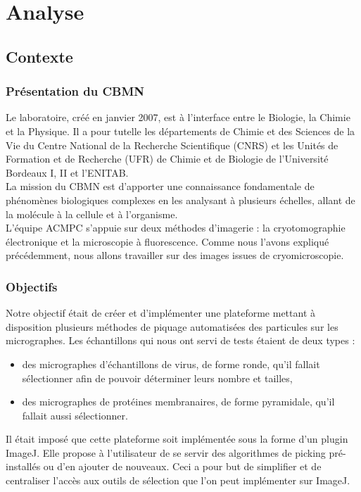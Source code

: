 \chapter{Analyse}

\section{Contexte}

\subsection{Présentation du CBMN}

Le laboratoire, créé en janvier 2007, est à l'interface entre le Biologie, la Chimie et la Physique. Il a pour tutelle les départements de Chimie et des Sciences de la Vie du Centre National de la Recherche Scientifique (CNRS) et les Unités de Formation et de Recherche (UFR) de Chimie et de Biologie de l'Université Bordeaux I, II et l'ENITAB. \\
La mission du CBMN est d'apporter une connaissance fondamentale de phénomènes biologiques complexes en les analysant à plusieurs échelles, allant de la molécule à la cellule et à l'organisme. \\
L'équipe ACMPC s'appuie sur deux méthodes d'imagerie : la cryotomographie  électronique et la microscopie à fluorescence. Comme nous l'avons expliqué précédemment, nous allons travailler sur des images issues de cryomicroscopie.  

\subsection{Objectifs}

\noindent
Notre objectif était de créer et d'implémenter une plateforme mettant à disposition plusieurs méthodes de piquage automatisées des particules sur les micrographes. Les échantillons qui nous ont servi de tests étaient de deux types :%
\begin{itemize}
\item des micrographes d'échantillons de virus, de forme ronde, qu'il fallait sélectionner afin de pouvoir déterminer leurs nombre et tailles,
\item des micrographes de protéines membranaires, de forme pyramidale, qu'il fallait aussi sélectionner.\\
\end{itemize}
\noindent
Il était imposé que cette plateforme soit implémentée sous la forme d'un plugin ImageJ. Elle propose à l'utilisateur de se servir des algorithmes de picking pré-installés ou d'en ajouter de nouveaux. Ceci a pour but de simplifier et de centraliser l'accès aux outils de sélection que l'on peut implémenter sur ImageJ.\\%

